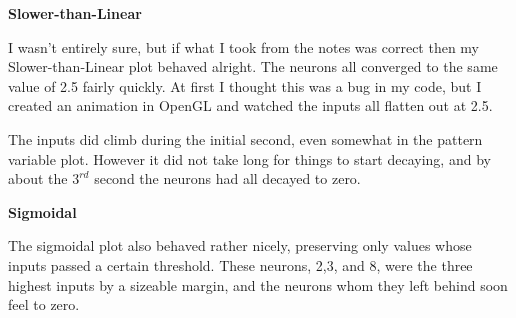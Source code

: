 \documentclass[a4paper,12pt]{article}
\begin{document}
\begin{figure}[h!]
\end{figure}

\begin{figure}[h!]
\begin{center}
\end{center}
\end{figure}

\bigskip

{\bf Slower-than-Linear}

\bigskip

I wasn't entirely sure, but if what I took from the notes was correct then my Slower-than-Linear plot behaved alright. The neurons all converged to the same value of 2.5 fairly quickly. At first I thought this was a bug in my code, but I created an animation in OpenGL and watched the inputs all flatten out at 2.5. 

\vspace{2mm}

The inputs did climb during the initial second, even somewhat in the pattern variable plot. However it did not take long for things to start decaying, and by about the $3^{rd}$ second the neurons had all decayed to zero. 

\begin{figure}[h!]
\end{figure}

\begin{figure}[h!]
\begin{center}
\end{center}
\end{figure}

\vfil\eject

{\bf Sigmoidal}

\bigskip

The sigmoidal plot also behaved rather nicely, preserving only values whose inputs passed a certain threshold. These neurons, 2,3, and 8, were the three highest inputs by a sizeable margin, and the neurons whom they left behind soon feel to zero. 

\vspace{2mm}
\end{document}
